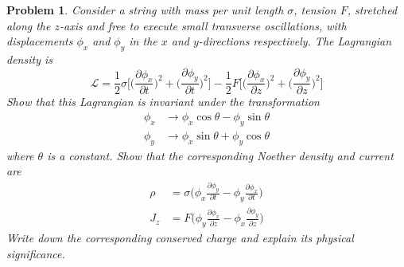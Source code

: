 \documentclass[a4paper]{article}
\theoremstyle{new}
\newtheorem{qns}{Problem}[section]
\begin{document}
\newpage
\begin{qns}
Consider a string with mass per unit length $\sigma$, tension $F$, stretched along the $z$-axis and free to execute small transverse oscillations, with displacements $\phi_x$ and $\phi_y$ in the $x$ and $y$-directions respectively. The Lagrangian density is
$$\mathcal{L}=\frac{1}{2}\sigma\bigg[\bigg(\frac{\partial\phi_x}{\partial t}\bigg)^2+\bigg(\frac{\partial\phi_y}{\partial t}\bigg)^2\bigg]-\frac{1}{2}F\bigg[\bigg(\frac{\partial\phi_x}{\partial z}\bigg)^2+\bigg(\frac{\partial\phi_y}{\partial z}\bigg)^2\bigg]$$
Show that this Lagrangian is invariant under the transformation
\begin{align}
    \phi_x&\rightarrow\phi_x\cos\theta-\phi_y\sin\theta\nonumber\\\phi_y&\rightarrow\phi_x\sin\theta+\phi_y\cos\theta\nonumber
\end{align}
where $\theta$ is a constant. Show that the corresponding Noether density and current are
\begin{align}
    \rho&=\sigma\bigg(\phi_x\frac{\partial\phi_y}{\partial t}-\phi_y\frac{\partial\phi_x}{\partial t}\bigg)\nonumber\\J_z&=F\bigg(\phi_y\frac{\partial\phi_x}{\partial z}-\phi_x\frac{\partial\phi_y}{\partial z}\bigg)\nonumber
\end{align}
Write down the corresponding conserved charge and explain its physical significance.
\end{qns}
\end{document}

